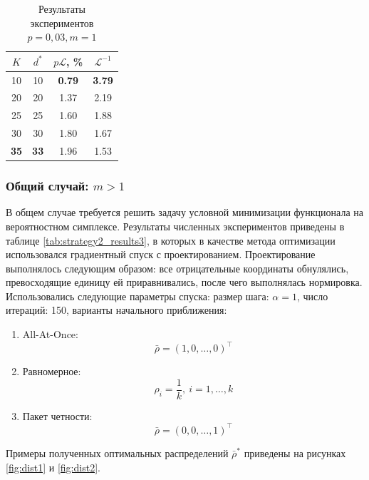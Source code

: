 \begin{table}[h!]
\begin{center}
    \begin{tabular}{|c|c|c|c|}
        \hline
        $K$ & $d^*$ & $p \mathcal L$, \% & $\mathcal L^{-1}$ \\
        \hline
        10 & 10 & \textbf{0.79} & \textbf{3.79} \\
        \hline
        20 & 20 & 1.37 & 2.19 \\
        \hline
        25 & 25 & 1.60 & 1.88 \\ 
        \hline
        30 & 30 & 1.80 & 1.67 \\ 
        \hline
        \textbf{35} & \textbf{33} & 1.96 & 1.53 \\
        \hline
    \end{tabular}
    \caption{Результаты экспериментов\\$p=0{,}03, m=1$}
    \label{tab:strategy2_results2}
\end{center}
\end{table}

\subsubsection{Общий случай: $m>1$}

В общем случае требуется решить задачу условной минимизации функционала на вероятностном симплексе. Результаты  численных экспериментов приведены в таблице \ref{tab:strategy2_results3}, в которых в качестве
метода оптимизации использовался градиентный спуск с проектированием. Проектирование
выполнялось следующим образом: все отрицательные координаты обнулялись, превосходящие
единицу ей приравнивались, после чего выполнялась нормировка. 
Использовались следующие параметры спуска: размер шага: $\alpha=1$, число итераций: 150, 
варианты начального приближения: 

\begin{enumerate}
    \item All-At-Once: 
        \[\bar\rho = (1,0,\dots,0)^\top\] 
    \item Равномерное: 
        \[\rho_i = \frac 1k, \: i = 1,\dots,k\] 
    \item Пакет четности: 
        \[\bar\rho = (0, 0,\dots, 1)^\top\]
\end{enumerate} 

Примеры полученных оптимальных распределений $\bar\rho^*$ приведены на 
рисунках \ref{fig:dist1} и \ref{fig:dist2}.

